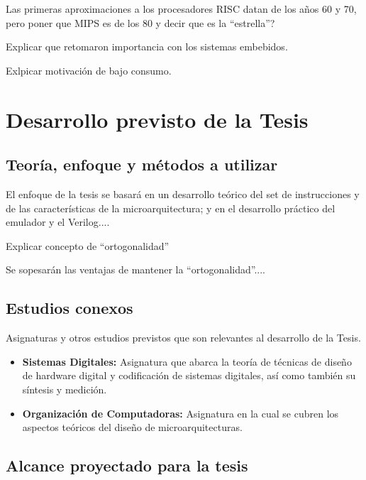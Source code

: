 \documentclass[a4paper]{article}
\begin{document}
Las primeras aproximaciones a los procesadores RISC datan de los años 60 y 70, pero poner que MIPS es de los 80 y decir que es la ``estrella''?

Explicar que retomaron importancia con los sistemas embebidos.

Exlpicar motivación de bajo consumo.

\section{Desarrollo previsto de la Tesis}

\subsection{Teoría, enfoque y métodos a utilizar}

El enfoque de la tesis se basará en un desarrollo teórico del set de instrucciones y de las características de la microarquitectura; y en el desarrollo
práctico del emulador y el Verilog....

Explicar concepto de ``ortogonalidad''

Se sopesarán las ventajas de mantener la ``ortogonalidad''....

\subsection{Estudios conexos}

Asignaturas y otros estudios previstos que son relevantes al desarrollo de la Tesis.

\begin{itemize}
	\item \textbf{Sistemas Digitales:} Asignatura que abarca la teoría de técnicas de diseño de hardware digital y codificación de sistemas digitales, así como también su síntesis y medición.
	\item \textbf{Organización de Computadoras:} Asignatura en la cual se cubren los aspectos teóricos del diseño de microarquitecturas.
\end{itemize}

\subsection{Alcance proyectado para la tesis}
\end{document}
